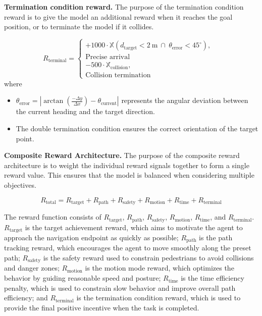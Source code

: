\documentclass[lettersize,journal]{IEEEtran}
\begin{document}
\textbf{Termination condition reward.}
%
The purpose of the termination condition reward is to give the model an additional reward when it reaches the goal position, or to terminate the model if it collides.

\begin{equation}
	R_{\text{terminal}} =
	\begin{cases}
		+1000 \cdot \mathbb{X}(d_{\text{target}} < 2\ \text{m}\ \cap\ \theta_{\text{error}} < 45^\circ), & \\ \text{Precise arrival} \\
		-500 \cdot \mathbb{X}_{\text{collision}}, & \\ \text{Collision termination}
	\end{cases}
\end{equation}
where 
\begin{itemize}
	\item \( \theta_{\text{error}} = \left| \arctan\left(\frac{-\Delta y}{\Delta x}\right) - \theta_{\text{current}} \right| \) represents the angular deviation between the current heading and the target direction.
	\item The double termination condition ensures the correct orientation of the target point.
\end{itemize}


\textbf{Composite Reward Architecture.}
%
The purpose of the composite reward architecture is to weight the individual reward signals together to form a single reward value. 
This ensures that the model is balanced when considering multiple objectives.

\begin{equation}
	R_{\text{total}} = R_{\text{target}} + R_{\text{path}} + R_{\text{safety}} + R_{\text{motion}} + R_{\text{time}} + R_{\text{terminal}}
\end{equation}

The reward function consists of \( R_{\text{target}} \), \( R_{\text{path}} \), \( R_{\text{safety}} \), \( R_{\text{motion}} \), \( R_{\text{time}} \), and \( R_{\text{terminal}} \). 
\( R_{\text{target}} \) is the target achievement reward, which aims to motivate the agent to approach the navigation endpoint as quickly as possible; 
\( R_{\text{path}} \) is the path tracking reward, which encourages the agent to move smoothly along the preset path; 
\( R_{\text{safety}} \) is the safety reward used to constrain pedestrians to avoid collisions and danger zones; 
\( R_{\text{motion}} \) is the motion mode reward, which optimizes the behavior by guiding reasonable speed and posture; 
\( R_{\text{time}} \) is the time efficiency penalty, which is used to constrain slow behavior and improve overall path efficiency; 
and \( R_{\text{terminal}} \) is the termination condition reward, which is used to provide the final positive incentive when the task is completed.
\end{document}
